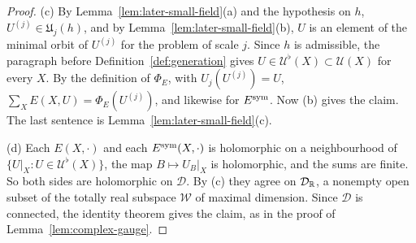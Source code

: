 \begin{proof}
(c) By Lemma~\ref{lem:later-small-field}(a) and the hypothesis on $h$, $U^{(j)}\in\mathfrak U_j(h)$, and by Lemma~\ref{lem:later-small-field}(b), $U$ is an element of the minimal orbit of $U^{(j)}$ for the problem of scale $j$. Since $h$ is admissible, the paragraph before Definition~\ref{def:generation} gives $U\in\mathcal U^\flat(X)\subset\mathcal U(X)$ for every $X$. By the definition of $\Phi_E$, with $U_j(U^{(j)})=U$, $\sum_XE(X,U)=\Phi_E(U^{(j)})$, and likewise for $E^{\rm sym}$. Now (b) gives the claim. The last sentence is Lemma~\ref{lem:later-small-field}(c).

(d) Each $E(X,\cdot)$ and each $E^{\rm sym}(X,\cdot)$ is holomorphic on a neighbourhood of $\{U|_X:U\in\mathcal U^\flat(X)\}$, the map $B\mapsto U_B|_X$ is holomorphic, and the sums are finite. So both sides are holomorphic on $\mathcal D$. By (c) they agree on $\mathcal D_\mathbb R$, a nonempty open subset of the totally real subspace $\mathcal W$ of maximal dimension. Since $\mathcal D$ is connected, the identity theorem gives the claim, as in the proof of Lemma~\ref{lem:complex-gauge}.
\end{proof}

